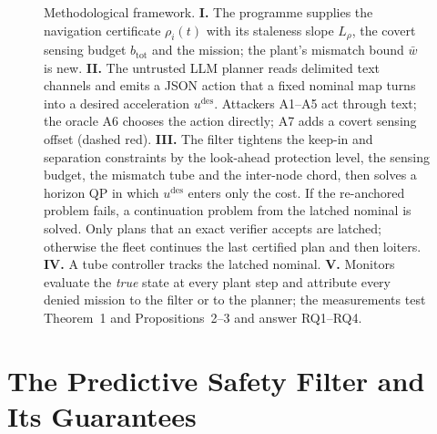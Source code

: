 \begin{figure}[t]
{}
\caption{Methodological framework. \textbf{I.} The programme supplies the
navigation certificate $\rho_i(t)$ with its staleness slope $L_\rho$, the
covert sensing budget $b_{\mathrm{tot}}$ and the mission; the plant's
mismatch bound $\bar w$ is new. \textbf{II.} The untrusted LLM planner reads
delimited text channels and emits a JSON action that a fixed nominal map
turns into a desired acceleration $u^{\mathrm{des}}$. Attackers A1--A5 act
through text; the oracle A6 chooses the action directly; A7 adds a covert
sensing offset (dashed red). \textbf{III.} The filter tightens the keep-in
and separation constraints by the look-ahead protection level, the sensing
budget, the mismatch tube and the inter-node chord, then solves a horizon QP
in which $u^{\mathrm{des}}$ enters only the cost. If the re-anchored problem
fails, a continuation problem from the latched nominal is solved. Only plans
that an exact verifier accepts are latched; otherwise the fleet continues the
last certified plan and then loiters. \textbf{IV.} A tube controller tracks
the latched nominal. \textbf{V.} Monitors evaluate the \emph{true} state at
every plant step and attribute every denied mission to the filter or to the
planner; the measurements test Theorem~1 and Propositions~2--3 and answer
RQ1--RQ4.}
\label{fig:framework}
\end{figure}

\section{The Predictive Safety Filter and Its Guarantees}\label{sec:method}
